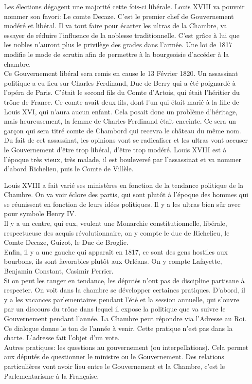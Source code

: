\documentclass[10pt, a4paper, openany]{book}
\begin{document}
Les élections dégagent une majorité cette fois-ci libérale. Louis XVIII va pouvoir nommer son favori: Le comte Decaze. C'est le premier chef de Gouvernement modéré et libéral. Il va tout faire pour écarter les ultras de la Chambre, va essayer de réduire l'influence de la noblesse traditionnelle. C'est grâce à lui que les nobles n'auront plus le privilège des grades dans l'armée. Une loi de 1817 modifie le mode de scrutin afin de permettre à la bourgeoisie d'accéder à la chambre. \\
Ce Gouvernement libéral sera remis en cause le 13 Février 1820. Un assassinat politique a eu lieu sur Charles Ferdinand, Duc de Berry qui a été poignardé à l'opéra de Paris. C'était le second fils du Comte d'Artois, qui était l'héritier du trône de France. Ce comte avait deux fils, dont l'un qui était marié à la fille de Louis XVI, qui n'aura aucun enfant. Cela posait donc un problème d'héritage, mais heureusement, la femme de Charles Ferdinand était enceinte. Ce sera un garçon qui sera titré comte de Chambord qui recevra le château du même nom. \\
Du fait de cet assassinat, les opinions vont se radicaliser et les ultras vont accuser le Gouvernement d'être trop libéral, d'être trop modéré. Louis XVIII est à l'époque très vieux, très malade, il est bouleversé par l'assassinat et va nommer d'abord Richelieu, puis le Comte de Villèle. 


Louis XVIII a fait varié ses ministères en fonction de la tendance politique de la Chambre. On va voir éclore des partis, qui sont plutôt à l'époque des hommes qui se réunissent en fonction de leurs idées politiques. Il y a les ultras bien sûr avec pour symbole Henry IV. \\
Il y a un centre, qui eux, veulent une Monarchie constitutionnelle, libérale, respectueuse des acquis révolutionnaire, on y compte le duc de Richelieu, le Comte Decaze, Guizot, le Duc de Broglie. \\
Enfin, il y a une gauche qui apparaît en 1817, ce sont des gens hostiles aux bourbons, ils sont favorables plutôt aux Orléans. On y compte Lafayette, Benjamin Constant, Casimir Perrier. \\
Si on peut les ranger en tendance, les députés n'ont pas de discipline partisane à respecter. On voit dans la chambre se développer certaines pratiques. D'abord, il y a les vacances parlementaires pendant l'été et la session annuelle, qui s'ouvre par un discours du trône dans lequel il expose la politique que va suivre le Gouvernement pendant l'année. La Chambre peut répondre via l'Adresse au Roi. Ce dialogue donne le ton de l'année à venir. Cette pratique n'est pas dans la charte. L'adresse fait l'objet d'un vote. \\
Autres pratiques: les questions au gouvernement (ou interpellations). Cela permet aux députés de questionner le ministre ou le Gouvernement. Des relations particulières vont avoir lieu entre le Gouvernement et la Chambre, c'est le Parlementarisme à la Française. 
\end{document}

